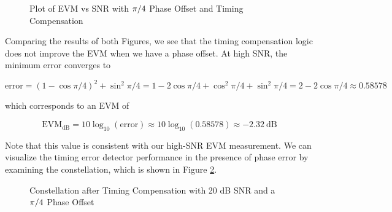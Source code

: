 \documentclass{article}
\begin{document}
\begin{figure}[H]
	\centerline{}
	\caption{Plot of EVM vs SNR with $\protect\pi/4$ Phase Offset and Timing Compensation}
	\label{fig::evm_pi_4_phase_offset}
\end{figure}

Comparing the results of both Figures, we see that the timing compensation logic does not improve the EVM when we have a phase offset. At high SNR, the minimum error converges to

\begin{equation}
	\text{error} = (1 - \cos\pi/4)^2 + \sin^2\pi/4 = 1 - 2\cos\pi/4 + \cos^2\pi/4 + \sin^2\pi/4 = 2 - 2\cos\pi/4 \approx 0.58578 
\end{equation}

\noindent which corresponds to an EVM of 

\begin{equation}
	\text{EVM}_{\text{dB}} = 10\log_{10}\left(\text{error}\right) \approx 10\log_{10}(0.58578) \approx -2.32\ \text{dB}
\end{equation}

\noindent Note that this value is consistent with our high-SNR EVM measurement. We can visualize the timing error detector performance in the presence of phase error by examining the constellation, which is shown in Figure \ref{fig::constellation_phase_error}.

\begin{figure}[H]
	\centerline{}
	\caption{Constellation after Timing Compensation with 20 dB SNR and a $\protect\pi/4$ Phase Offset}
	\label{fig::constellation_phase_error}
\end{figure}
\end{document}
